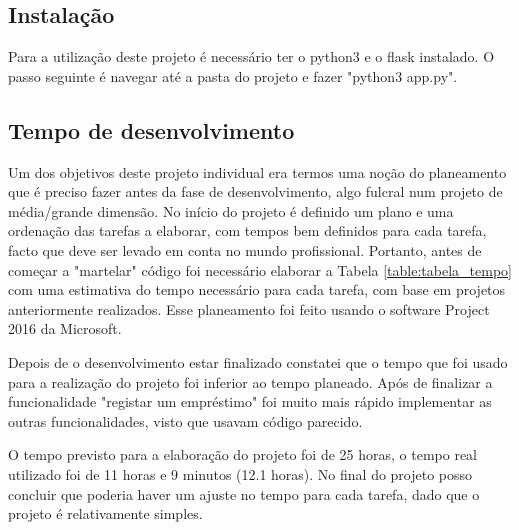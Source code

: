 \documentclass[12pt, a4paper, twoside]{article}
\begin{document}
\subsection{Instalação}

Para a utilização deste projeto é necessário ter o python3 e o flask instalado. O passo seguinte é navegar até a pasta do projeto e fazer "python3 app.py".

\subsection{Tempo de desenvolvimento}

Um dos objetivos deste projeto individual era termos uma noção do planeamento que é preciso fazer antes da fase de desenvolvimento, algo fulcral num projeto de média/grande dimensão. No início do projeto é definido um plano e uma ordenação das tarefas a elaborar, com tempos bem definidos para cada tarefa, facto que deve ser levado em conta no mundo profissional. Portanto, antes de começar a 
"martelar" código foi necessário elaborar a Tabela \ref{table:tabela_tempo} com uma estimativa do tempo necessário para cada tarefa, com base em projetos anteriormente realizados. Esse planeamento foi feito usando o software Project 2016 da Microsoft. \par Depois de o desenvolvimento estar finalizado constatei que o tempo que foi usado para a realização do projeto foi inferior ao tempo planeado. Após de finalizar a funcionalidade "registar um empréstimo" foi muito mais rápido implementar as outras funcionalidades, visto que usavam código parecido. \par O tempo previsto para a elaboração do projeto foi de 25 horas, o tempo real utilizado foi de 11 horas e 9 minutos (12.1 horas). No final do projeto posso concluir que poderia haver um ajuste no tempo para cada tarefa, dado que o projeto é relativamente simples.

\end{document}
